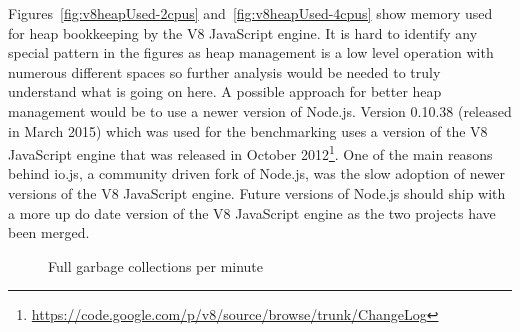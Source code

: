 \noindent
Figures~\ref{fig:v8heapUsed-2cpus} and~\ref{fig:v8heapUsed-4cpus} show memory used for heap bookkeeping by the V8 JavaScript engine. It is hard to identify any special pattern in the figures as heap management is a low level operation with numerous different spaces so further analysis would be needed to truly understand what is going on here. A possible approach for better heap management would be to use a newer version of Node.js. Version 0.10.38 (released in March 2015) which was used for the benchmarking uses a version of the V8 JavaScript engine that was released in October 2012\footnote{\url{https://code.google.com/p/v8/source/browse/trunk/ChangeLog}}. One of the main reasons behind io.js, a community driven fork of Node.js, was the slow adoption of newer versions of the V8 JavaScript engine. Future versions of Node.js should ship with a more up do date version of the V8 JavaScript engine as the two projects have been merged.
\\
\begin{figure}[h!]
	\centering
	 \hfill
	\caption{Full garbage collections per minute}
\end{figure}

